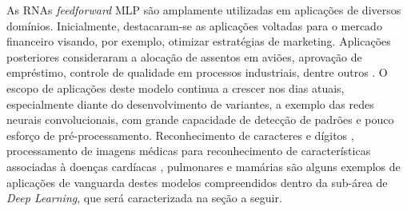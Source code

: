 As RNAs \emph{feedforward} MLP são amplamente utilizadas em aplicações de diversos domínios. Inicialmente, destacaram-se as aplicações voltadas para o mercado financeiro visando, por exemplo, otimizar estratégias de marketing. Aplicações posteriores consideraram a alocação de assentos em aviões, aprovação de empréstimo, controle de qualidade em processos industriais, dentre outros \cite{widrow1994neural}. O escopo de aplicações deste modelo continua a crescer nos dias atuais, especialmente diante do desenvolvimento de variantes, a exemplo das redes neurais convolucionais, com grande capacidade de detecção de padrões e pouco esforço de pré-processamento. Reconhecimento de caracteres e dígitos  \cite{lenet}, processamento de imagens médicas para reconhecimento de características associadas à doenças cardíacas \cite{oktay2018anatomically}, pulmonares \cite{mingchen2018holistic} e mamárias \cite{dubrovina2018mammography} são alguns exemplos de aplicações de vanguarda destes modelos compreendidos dentro da sub-área de \emph{Deep Learning}, que será caracterizada na seção a seguir.
